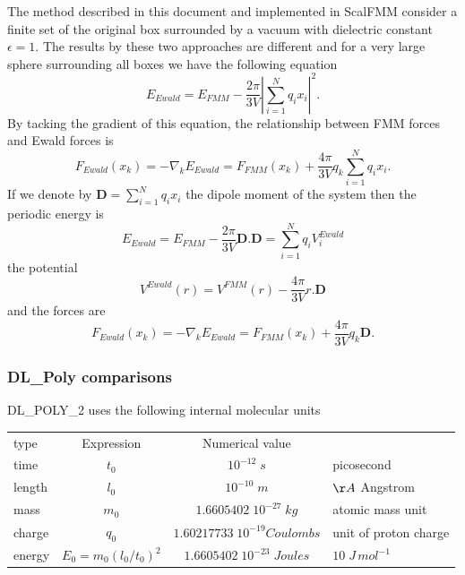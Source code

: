 \documentclass[12pt]{article} %
\begin{document}
The method described in this document and implemented in ScalFMM consider a finite set of the original box surrounded by a vacuum with dielectric constant $\epsilon=1$. The results by these two approaches are different \cite{DeLeeuw1980, Heyes1981} and for a very large sphere surrounding all boxes we have the following equation
\begin{equation}
E_{Ewald} = E_{FMM} -\frac{2\pi}{3V}|\sum_{i=1}^{N}{q_i x_i}|^2.
\end{equation}
By tacking the gradient of this equation, the relationship between FMM forces and Ewald forces is
\begin{equation}
F_{Ewald}(x_k) = -\nabla_k E_{Ewald} = F_{FMM}(x_k)  + \frac{4\pi}{3V} q_k \sum_{i=1}^{N}{q_i x_i}.
\end{equation}
If we denote by $\mathbf{D}= \sum_{i=1}^{N}{q_i x_i}$ the dipole moment of the system then the periodic energy is   
\begin{equation}
E_{Ewald} = E_{FMM} - \frac{2\pi}{3V}\mathbf{D}.\mathbf{D} =\sum_{i=1}^{N}{q_i V_i^{Ewald}}
\end{equation}
the potential 
\begin{equation}
V^{Ewald}(r) = V^{FMM}(r) - \frac{4\pi}{3V} r.\mathbf{D}  
\end{equation}
and the forces are
\begin{equation}
F_{Ewald}(x_k) = -\nabla_k E_{Ewald} = F_{FMM}(x_k)  + \frac{4\pi}{3V} q_k \mathbf{D}.
\end{equation}


\subsubsection{DL\_Poly comparisons}
DL\_POLY\_2 uses the following internal molecular units \\

\begin{tabular}{|l|c|c|l|}
\hline
type & Expression & Numerical value & \\
time &$t_0$ & $10^{-12}\;s$& picosecond\\
length & $l_0$ &$10^{-10}\; m $& $\AA$ Angstrom\\
mass &  $m_0$ & $ 1.6605402 \; 10^{−27}\; kg $& atomic mass unit\\
charge &  $q_0$ & $1.60217733 \; 10^{−19} Coulombs$& unit of proton charge\\
energy & $E_0 = m_0(l_0/t_0)^2$&$1.6605402 \;  10^{−23}\; Joules $ & $10\; J\, mol^{-1}$\\
\hline
\end{tabular}
\end{document}
